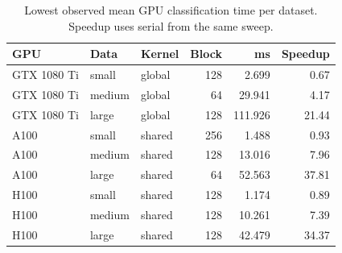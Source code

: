 \begin{table}[t]
\centering\caption{Lowest observed mean GPU classification time per dataset. Speedup uses serial from the same sweep.}\label{tab:best}
\small\setlength{\tabcolsep}{3pt}\begin{tabular}{lllrrr}\toprule
GPU & Data & Kernel & Block & ms & Speedup \\
\midrule
GTX 1080 Ti & small & global & 128 & 2.699 & 0.67 \\
GTX 1080 Ti & medium & global & 64 & 29.941 & 4.17 \\
GTX 1080 Ti & large & global & 128 & 111.926 & 21.44 \\
A100 & small & shared & 256 & 1.488 & 0.93 \\
A100 & medium & shared & 128 & 13.016 & 7.96 \\
A100 & large & shared & 64 & 52.563 & 37.81 \\
H100 & small & shared & 128 & 1.174 & 0.89 \\
H100 & medium & shared & 128 & 10.261 & 7.39 \\
H100 & large & shared & 128 & 42.479 & 34.37 \\
\bottomrule\end{tabular}
\end{table}
